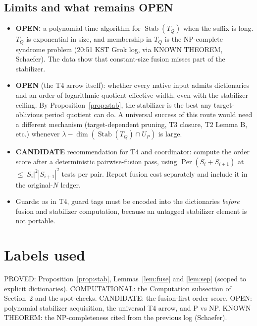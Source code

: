 \documentclass[11pt]{article}
\newcommand{\Per}{\operatorname{Per}}
\newcommand{\Stab}{\operatorname{Stab}}
\begin{document}
\subsection*{Limits and what remains OPEN}
\begin{itemize}
\item \textbf{OPEN:} a polynomial-time algorithm for $\Stab(T_Q)$ when the suffix is long. $T_Q$ is exponential in size, and membership in $T_Q$ is the NP-complete
syndrome problem (20:51 KST Grok log, via KNOWN THEOREM, Schaefer). The data show that constant-size fusion misses part of the stabilizer.
\item \textbf{OPEN} (the T4 arrow itself): whether every native input admits dictionaries and an order of logarithmic quotient-effective width, even with
the stabilizer ceiling. By Proposition~\ref{prop:stab}, the stabilizer is the best any target-oblivious period quotient can do. A universal success of this route would need a
different mechanism (target-dependent pruning, T3 closure, T2 Lemma B, etc.) whenever $\lambda-\dim(\Stab(T_Q)\cap U_P)$ is large.
\item \textbf{CANDIDATE} recommendation for T4 and coordinator: compute the order score after a deterministic pairwise-fusion pass, using
$\Per(S_i+S_{i+1})$ at $\le|S_i|^2|S_{i+1}|^2$ tests per pair. Report fusion cost separately and include it in the original-$N$ ledger.
\item Guards: as in T4, guard tags must be encoded into the dictionaries \emph{before} fusion and stabilizer computation, because an untagged stabilizer element is not portable.
\end{itemize}

\section*{Labels used}
PROVED: Proposition~\ref{prop:stab}, Lemmas~\ref{lem:fuse} and \ref{lem:sep} (scoped to explicit dictionaries).
COMPUTATIONAL: the Computation subsection of Section~2 and the spot-checks. CANDIDATE: the fusion-first order score. OPEN: polynomial stabilizer acquisition, the universal T4 arrow, and P vs NP.
KNOWN THEOREM: the NP-completeness cited from the previous log (Schaefer).
\end{document}
